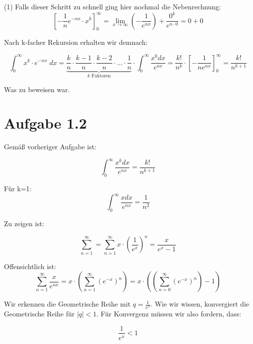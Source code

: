 \documentclass[a4paper,german,12pt,smallheadings]{scrartcl}
\begin{document}
(1) Falls dieser Schritt zu schnell ging hier nochmal die Nebenrechnung:
\begin{equation*}
\left[-\frac{1}{n} e^{-nx} \cdot x^k\right]_0^\infty = \lim\limits_{x \to \infty}\left(-\frac{1}{e^{nx}}\right) + \frac{0^k}{e^{n\cdot 0}}=0 + 0
\end{equation*}

Nach k-facher Rekursion erhalten wir demnach:

\begin{equation*}
  \int_0^\infty x^k \cdot e^{-nx} \; dx = \underbrace{\frac{k}{n} \cdot \frac{k-1}{n} \cdot \frac{k-2}{n} \cdot \dots \cdot \frac{1}{n}}_{k\text{ Faktoren}} \cdot  \int_{0}^{\infty} \frac{x^0dx}{e^{nx}}= \frac{k!}{n^k}\cdot\left[-\frac{1}{ne^{nx}}\right]_0^\infty=\frac{k!}{n^{k+1}}
\end{equation*}

Was zu beweisen war.


\section*{Aufgabe 1.2}

Gemäß vorheriger Aufgabe ist:

\begin{equation*}
\int_{0}^{\infty}\frac{x^kdx}{e^{nx}}=\frac{k!}{n^{k+1}}
\end{equation*}

Für k=1:
\begin{equation*}
\int_{0}^{\infty}\frac{xdx}{e^{nx}}=\frac{1}{n^2}
\end{equation*}

Zu zeigen ist:

\begin{equation*}
\sum_{n=1}^{\infty}=\sum_{n=1}^{\infty}x\cdot\left(\frac{1}{e^x}\right)^n=\frac{x}{e^x-1}
\end{equation*}

Offensichtlich ist:
\begin{equation*}
    \sum_{n=1}^\infty \frac{x}{e^{nx}} = x \cdot \left(\sum_{n=1}^\infty \left(e^{-x}\right)^n\right) = x \cdot \left(\left(\sum_{n=0}^\infty \left(e^{-x}\right)^n\right) - 1\right)
\end{equation*}

Wir erkennen die Geometrische Reihe mit $q=\frac{1}{e^x}$. Wie wir wissen, konvergiert die Geometrische Reihe für $|q|<1$. Für Konvergenz müssen wir also fordern, dass:

\begin{equation*}
\frac{1}{e^x}<1
\end{equation*}
\end{document}
